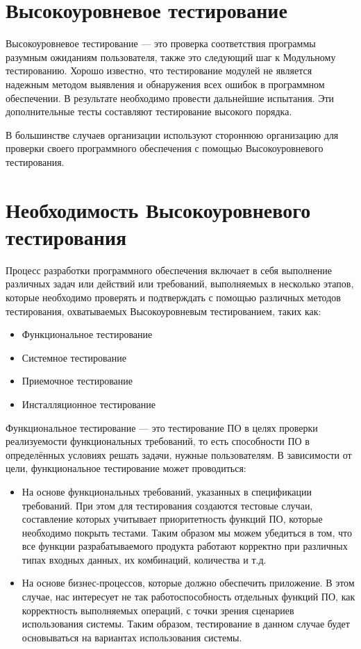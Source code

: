 \documentclass[12pt]{article}
\begin{document}
    \section*{Высокоуровневое тестирование}
    Высокоуровневое тестирование --- это проверка соответствия программы разумным ожиданиям пользователя, также это следующий шаг к Модульному тестированию.  Хорошо известно, что тестирование модулей не является надежным методом выявления и обнаружения всех ошибок в программном обеспечении. В результате необходимо провести дальнейшие испытания. Эти дополнительные тесты составляют тестирование высокого порядка.



    В большинстве случаев организации используют стороннюю организацию для проверки своего программного обеспечения с помощью Высокоуровневого тестирования.

    \section*{Необходимость Высокоуровневого тестирования}
    Процесс разработки программного обеспечения включает в себя выполнение различных задач или действий или требований, выполняемых в несколько этапов, которые необходимо проверять и подтверждать с помощью различных методов тестирования, охватываемых Высокоуровневым тестированием, таких как:
    \begin{itemize}
        \item Функциональное тестирование
        \item Системное тестирование
        \item Приемочное тестирование
        \item Инсталляционное тестирование
    \end{itemize}


    Функциональное   тестирование --- это тестирование ПО в целях проверки реализуемости функциональных требований, то есть способности ПО в определённых условиях решать задачи, нужные пользователям. В зависимости от цели, функциональное тестирование может проводиться:
    \begin{itemize}
        \item На основе функциональных требований, указанных в спецификации требований. При  этом  для  тестирования  создаются  тестовые  случаи, составление  которых  учитывает  приоритетность  функций  ПО,  которые необходимо покрыть тестами. Таким образом мы можем убедиться в том, что все функции разрабатываемого продукта работают корректно при различных типах входных данных, их комбинаций, количества и т.д.
        \item На основе бизнес-процессов, которые должно обеспечить приложение. В этом  случае,  нас  интересует  не  так  работоспособность  отдельных  функций ПО,  как  корректность  выполняемых  операций,  с  точки  зрения  сценариев использования системы. Таким образом, тестирование в данном случае будет основываться на вариантах использования системы.
    \end{itemize}
\end{document}
